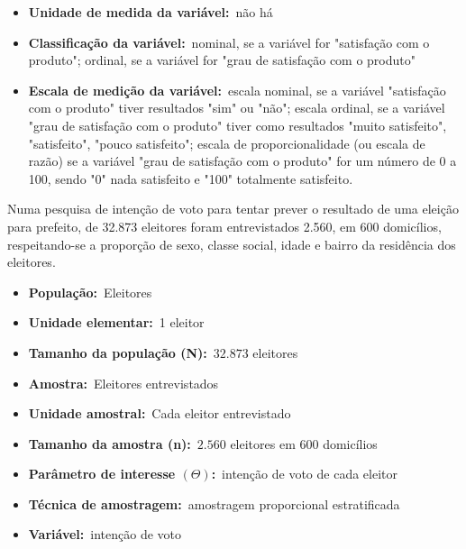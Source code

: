 \begin{enumerate}
\begin{itemize}
		\item \textbf{Unidade de medida da variável:}~não há
		
		\item \textbf{Classificação da variável:}~nominal, se a variável for "satisfação com o produto"; ordinal, se a variável
for "grau de satisfação com o produto"
		
		\item \textbf{Escala de medição da variável:}~escala nominal, se a variável "satisfação com o produto" tiver resultados
"sim" ou "não"; escala ordinal, se a variável "grau de satisfação com o produto" tiver como resultados
"muito satisfeito", "satisfeito", "pouco satisfeito"; escala de proporcionalidade (ou escala de razão) se a
variável "grau de satisfação com o produto" for um número de 0 a 100, sendo "0" nada satisfeito e "100"
totalmente satisfeito.
	\end{itemize}

	\subitem Numa pesquisa de intenção de voto para tentar prever o resultado de uma eleição para
prefeito, de 32.873 eleitores foram entrevistados 2.560, em 600 domicílios, respeitando-se a proporção de sexo, classe social, idade e bairro da residência dos eleitores.
	
	\begin{itemize}	
		\item \textbf{População:}~Eleitores
			
		\item \textbf{Unidade elementar:}~1 eleitor
		
		\item \textbf{Tamanho da população (N):}~$32.873$ eleitores
		
		\item \textbf{Amostra:}~Eleitores entrevistados
		
		\item \textbf{Unidade amostral:}~Cada eleitor entrevistado
		
		\item \textbf{Tamanho da amostra (n):}~$2.560$ eleitores em 600 domicílios
		
		\item \textbf{Parâmetro de interesse $\left(\varTheta\right)$:}~intenção de voto de cada eleitor
		
		\item \textbf{Técnica de amostragem:}~amostragem proporcional estratificada
		
		\item \textbf{Variável:}~intenção de voto
		

\end{itemize}
\end{enumerate}
